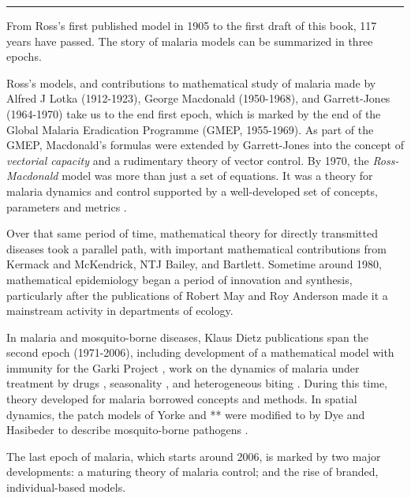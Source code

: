 \documentclass[
]{book}
\begin{document}
\begin{center}\rule{0.5\linewidth}{0.5pt}\end{center}

From Ross's first published model in 1905 to the first draft of this book, 117 years have passed. The story of malaria models can be summarized in three epochs.

Ross's models, and contributions to mathematical study of malaria made by Alfred J Lotka (1912-1923), George Macdonald (1950-1968), and Garrett-Jones (1964-1970) take us to the end first epoch, which is marked by the end of the Global Malaria Eradication Programme (GMEP, 1955-1969). As part of the GMEP, Macdonald's formulas were extended by Garrett-Jones into the concept of \emph{vectorial capacity} and a rudimentary theory of vector control. By 1970, the \emph{Ross-Macdonald} model was more than just a set of equations. It was a theory for malaria dynamics and control supported by a well-developed set of concepts, parameters and metrics \autocite{SmithDL2012_RossMacdonald}.

Over that same period of time, mathematical theory for directly transmitted diseases took a parallel path, with important mathematical contributions from Kermack and McKendrick, NTJ Bailey, and Bartlett. Sometime around 1980, mathematical epidemiology began a period of innovation and synthesis, particularly after the publications of Robert May and Roy Anderson made it a mainstream activity in departments of ecology.

In malaria and mosquito-borne diseases, Klaus Dietz publications span the second epoch (1971-2006), including development of a mathematical model with immunity for the Garki Project \autocite{DietzK1974GarkiModel}, work on the dynamics of malaria under treatment by drugs \autocite{DietzK1975ModelsParasitic}, seasonality \autocite{DietzK1976Seasonality}, and heterogeneous biting \autocite{DietzK1980ModelsVectorborne,DietzK1988EpidemiologicalModels}. During this time, theory developed for malaria borrowed concepts and methods. In spatial dynamics, the patch models of Yorke and ** were modified to by Dye and Hasibeder to describe mosquito-borne pathogens \autocite{DyeC1986PopulationDynamics,HasibederG1988PopulationDynamics}.

The last epoch of malaria, which starts around 2006, is marked by two major developments: a maturing theory of malaria control; and the rise of branded, individual-based models.
\end{document}
